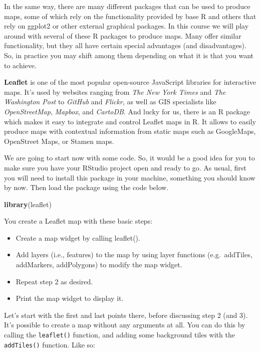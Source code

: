 \documentclass[]{book}
\newenvironment{Shaded}{\begin{snugshade}}{\end{snugshade}}
\newcommand{\KeywordTok}[1]{\textcolor[rgb]{0.13,0.29,0.53}{\textbf{#1}}}
\newcommand{\NormalTok}[1]{#1}
\providecommand{\tightlist}{%
  \setlength{\itemsep}{0pt}\setlength{\parskip}{0pt}}
\begin{document}
In the same way, there are many different packages that can be used to produce maps, some of which rely on the functionality provided by base R and others that rely on ggplot2 or other external graphical packages. In this course we will play around with several of these R packages to produce maps. Many offer similar functionality, but they all have certain special advantages (and disadvantages). So, in practice you may shift among them depending on what it is that you want to achieve.

\textbf{Leaflet} is one of the most popular open-source JavaScript libraries for interactive maps. It's used by websites ranging from \emph{The New York Times} and \emph{The Washington Post} to \emph{GitHub} and \emph{Flickr}, as well as GIS specialists like \emph{OpenStreetMap}, \emph{Mapbox}, and \emph{CartoDB}. And lucky for us, there is an R package which makes it easy to integrate and control Leaflet maps in R. It allows to easily produce maps with contextual information from static maps such as GoogleMaps, OpenStreet Maps, or Stamen maps.

We are going to start now with some code. So, it would be a good idea for you to make sure you have your RStudio project open and ready to go. As usual, first you will need to install this package in your machine, something you should know by now. Then load the package using the code below.

\begin{Shaded}
\begin{Highlighting}[]
\KeywordTok{library}\NormalTok{(leaflet)}
\end{Highlighting}
\end{Shaded}

You create a Leaflet map with these basic steps:

\begin{itemize}
\tightlist
\item
  Create a map widget by calling leaflet().
\item
  Add layers (i.e., features) to the map by using layer functions (e.g.~addTiles, addMarkers, addPolygons) to modify the map widget.
\item
  Repeat step 2 as desired.
\item
  Print the map widget to display it.
\end{itemize}

Let's start with the first and last points there, before discussing step 2 (and 3). It's possible to create a map without any arguments at all. You can do this by calling the \texttt{leaflet()} function, and adding some background tiles with the \texttt{addTiles()} function. Like so:
\end{document}

